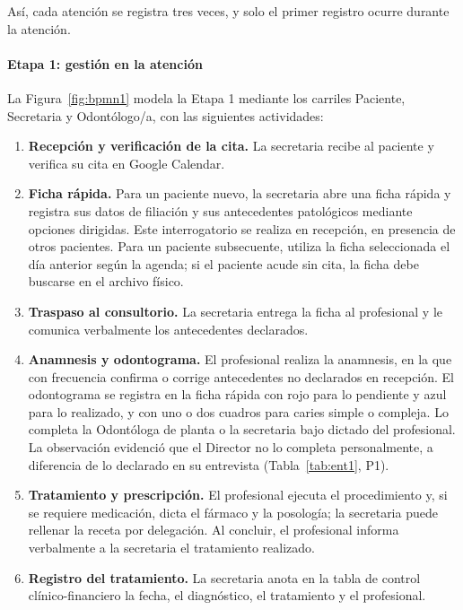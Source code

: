 Así, cada atención se registra tres veces, y solo el primer registro ocurre durante la atención.

\paragraph{Etapa 1: gestión en la atención}

La Figura~\ref{fig:bpmn1} modela la Etapa 1 mediante los carriles Paciente, Secretaria y Odontólogo/a, con las siguientes actividades:

\begin{enumerate}[leftmargin=*]
    \item \textbf{Recepción y verificación de la cita.} La secretaria recibe al paciente y verifica su cita en Google Calendar.

    \item \textbf{Ficha rápida.} Para un paciente nuevo, la secretaria abre una ficha rápida y registra sus datos de filiación y sus antecedentes patológicos mediante opciones dirigidas. Este interrogatorio se realiza en recepción, en presencia de otros pacientes. Para un paciente subsecuente, utiliza la ficha seleccionada el día anterior según la agenda; si el paciente acude sin cita, la ficha debe buscarse en el archivo físico.

    \item \textbf{Traspaso al consultorio.} La secretaria entrega la ficha al profesional y le comunica verbalmente los antecedentes declarados.

    \item \textbf{Anamnesis y odontograma.} El profesional realiza la anamnesis, en la que con frecuencia confirma o corrige antecedentes no declarados en recepción. El odontograma se registra en la ficha rápida con rojo para lo pendiente y azul para lo realizado, y con uno o dos cuadros para caries simple o compleja. Lo completa la Odontóloga de planta o la secretaria bajo dictado del profesional. La observación evidenció que el Director no lo completa personalmente, a diferencia de lo declarado en su entrevista (Tabla~\ref{tab:ent1}, P1).

    \item \textbf{Tratamiento y prescripción.} El profesional ejecuta el procedimiento y, si se requiere medicación, dicta el fármaco y la posología; la secretaria puede rellenar la receta por delegación. Al concluir, el profesional informa verbalmente a la secretaria el tratamiento realizado.

    \item \textbf{Registro del tratamiento.} La secretaria anota en la tabla de control clínico-financiero la fecha, el diagnóstico, el tratamiento y el profesional.


\end{enumerate}
